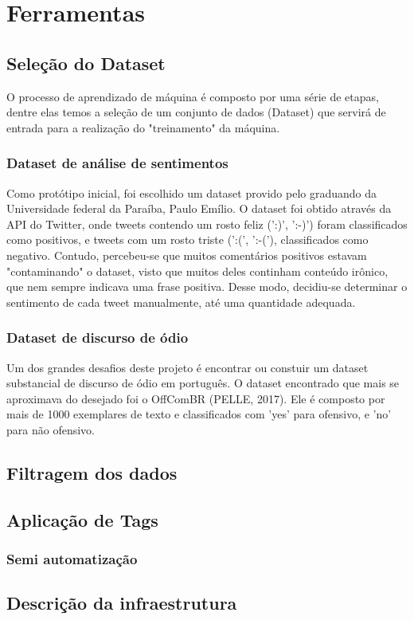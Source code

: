 \chapter[Ferramentas]{Ferramentas}

\section{Seleção do Dataset}

O processo de aprendizado de máquina é composto por uma série de etapas, dentre elas temos a seleção de um conjunto de dados (Dataset) que servirá de entrada para a realização do "treinamento" da máquina.

\subsection{Dataset de análise de sentimentos}
Como protótipo inicial, foi escolhido um dataset provido pelo graduando da Universidade federal da Paraíba, Paulo Emílio. O dataset foi obtido através da API do Twitter, onde tweets contendo um rosto feliz (':)', ':-)') foram classificados como positivos, e tweets com um rosto triste (':(', ':-('), classificados como negativo. Contudo, percebeu-se que muitos comentários positivos estavam "contaminando" o dataset, visto que muitos deles continham conteúdo irônico, que nem sempre indicava uma frase positiva. Desse modo, decidiu-se determinar o sentimento de cada tweet manualmente, até uma quantidade adequada.

\subsection{Dataset de discurso de ódio}
Um dos grandes desafios deste projeto é encontrar ou constuir um dataset substancial de discurso de ódio em português. O dataset encontrado que mais se aproximava do desejado foi o OffComBR (PELLE, 2017). Ele é composto por mais de 1000 exemplares de texto e classificados com 'yes' para ofensivo, e 'no' para não ofensivo.

\begin{comment}
## TODO Formatar a referência acima

@inproceedings{Pelle2017,
title={Offensive Comments in the Brazilian Web: a dataset and baseline results},
author={Rogers P. de Pelle and Viviane P. Moreira},
booktitle={6th Brazilian Workshop on Social Network Analysis and Mining (BraSNAM)},
year={2017},
note={to appear}
}

\end{comment}




\section{Filtragem dos dados}

\section{Aplicação de Tags}

\subsection{Semi automatização}

\section{Descrição da infraestrutura}
